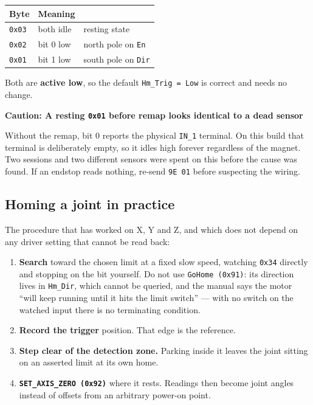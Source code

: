 \documentclass[11pt,letterpaper]{article}
\newenvironment{caution}[1]{%
    \par\addvspace{8pt}%
    \noindent{\color{cautionred}\rule{\linewidth}{0.8pt}}\par\vspace{2pt}
    \noindent\textbf{\color{cautionred}Caution: #1}\par\vspace{2pt}
}{%
    \par\vspace{2pt}\noindent{\color{cautionred}\rule{\linewidth}{0.4pt}}%
    \par\addvspace{8pt}%
}
\begin{document}
\begin{center}
\begin{tabular}{lll}
\toprule
\textbf{Byte} & \textbf{Meaning} & \\ \midrule
\texttt{0x03} & both idle & resting state \\
\texttt{0x02} & bit 0 low & north pole on \texttt{En} \\
\texttt{0x01} & bit 1 low & south pole on \texttt{Dir} \\
\bottomrule
\end{tabular}
\end{center}

Both are \textbf{active low}, so the default \texttt{Hm\_Trig = Low} is correct and
needs no change.

\begin{caution}{A resting \texttt{0x01} before remap looks identical to a dead sensor}
Without the remap, bit 0 reports the physical \texttt{IN\_1} terminal. On this build
that terminal is deliberately empty, so it idles high forever regardless of the
magnet. Two sessions and two different sensors were spent on this before the cause
was found. If an endstop reads nothing, re-send \texttt{9E 01} before suspecting the
wiring.
\end{caution}

\subsection{Homing a joint in practice}
The procedure that has worked on X, Y and Z, and which does not depend on any
driver setting that cannot be read back:

\begin{enumerate}
    \item \textbf{Search} toward the chosen limit at a fixed slow speed, watching
    \texttt{0x34} directly and stopping on the bit yourself. Do not use
    \texttt{GoHome (0x91)}: its direction lives in \texttt{Hm\_Dir}, which cannot
    be queried, and the manual says the motor ``will keep running until it hits
    the limit switch'' --- with no switch on the watched input there is no
    terminating condition.
    \item \textbf{Record the trigger} position. That edge is the reference.
    \item \textbf{Step clear of the detection zone.} Parking inside it leaves the
    joint sitting on an asserted limit at its own home.
    \item \textbf{\texttt{SET\_AXIS\_ZERO (0x92)}} where it rests. Readings then
    become joint angles instead of offsets from an arbitrary power-on point.
\end{enumerate}
\end{document}
